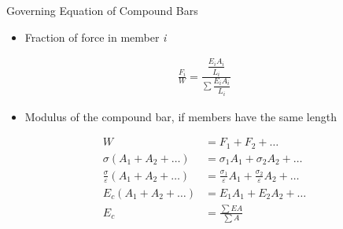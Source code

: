 \documentclass[10pt, svgnames]{beamer}
\begin{document}
\begin{frame}[label={sec:org03cf2a4}]{Governing Equation of Compound Bars}
\begin{itemize}
\item Fraction of force in member \emph{i}
\end{itemize}

\begin{align*}
  \frac{F_i}{W} = \frac{\dfrac{E_i A_i}{L_i}}{\displaystyle\sum \dfrac{E_i A_i}{L_i}}
\end{align*}

\begin{itemize}
\item Modulus of the compound bar, if members have the same length
\end{itemize}

\begin{align*}
    W &= F_1 + F_2 + \ldots \\
    \sigma \left(A_1 + A_2 + \ldots \right) &= \sigma_1 A_1 + \sigma_2 A_2 + \ldots \\
    \frac{\sigma}{\varepsilon} \left(A_1 + A_2 + \ldots \right) &= \frac{\sigma_1}{\varepsilon}A_1 + \frac{\sigma_2}{\varepsilon}A_2 + \ldots \\
    E_c \left(A_1 + A_2 + \ldots \right) &= E_1 A_1 + E_2 A_2 + \ldots \\
    E_c &= \frac{\sum EA}{\sum A}
\end{align*}
\end{frame}
\end{document}
